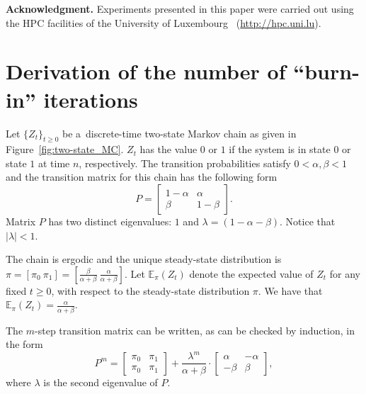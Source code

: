 \documentclass[runningheads,a4paper]{llncs}
\begin{document}
\medskip
\noindent
\textbf{Acknowledgment.}
Experiments presented in this paper were carried out using the HPC facilities of the University of Luxembourg~\cite{VBCG_HPCS14}
(\url{http://hpc.uni.lu}).




\newpage



\appendix

\section{Derivation of the number of ``burn-in'' iterations}
\label{app:m}
Let $\{Z_t\}_{t\geq 0}$ be a~discrete-time two-state Markov chain as given in
Figure~\ref{fig:two-state_MC}.
$Z_t$ has the value $0$ or $1$ if the system is in state $0$ or state $1$ at time $n$,
respectively. The transition probabilities satisfy $0<\alpha,\beta<1$ and the transition matrix
for this chain has the following form
\[
P = \left[ \begin{array}{cc}
1-\alpha & \alpha \\
\beta & 1-\beta
\end{array} \right].
\]
Matrix $P$ has two distinct eigenvalues: $1$ and $\lambda = (1-\alpha-\beta)$. Notice that
$|\lambda| < 1$.

The chain is ergodic and the unique steady-state distribution is $\pi = [\pi_0\ \pi_1] =
[\frac{\beta}{\alpha+\beta}\ \frac{\alpha}{\alpha+\beta}]$.
Let $\mathbb{E}_\pi(Z_t)$ denote the expected value of $Z_t$ for any fixed $t\geq 0$, with respect
to the steady-state distribution $\pi$. We have that
$\mathbb{E}_\pi(Z_t)=\frac{\alpha}{\alpha+\beta}$.

The $m$-step transition matrix can be written, as can be checked by induction, in the form
\begin{equation}
\label{eq:P}
P^m =
\left[ \begin{array}{cc}
\pi_0 & \pi_1 \\
\pi_0 & \pi_1
\end{array} \right] +
\frac{\lambda^m}{\alpha+\beta}\cdot
\left[ \begin{array}{cc}
\alpha & -\alpha \\
-\beta & \beta
\end{array} \right],
\end{equation}
where $\lambda$ is the second eigenvalue of $P$.
\end{document}
